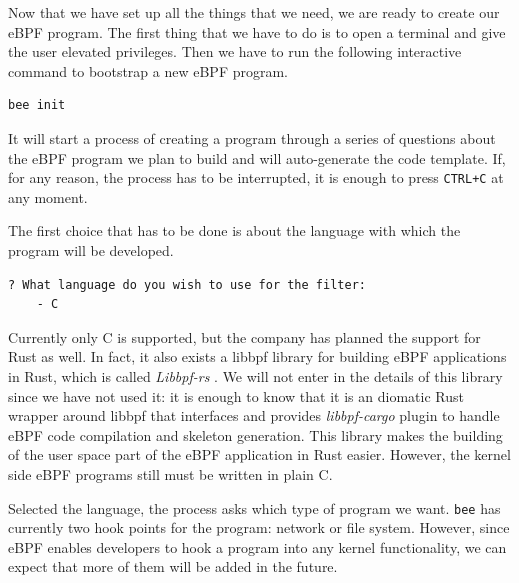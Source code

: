 Now that we have set up all the things that we need, we are ready to create our eBPF program.
The first thing that we have to do is to open a terminal and give the user elevated privileges.
Then we have to run the following interactive command to bootstrap a new eBPF program.

\begin{lstlisting}[style=commandline, language=bash, caption={\colorbox{backcolour}{\lstinline[style=commandline, language=bash]|bee|} init command.}]
	bee init
\end{lstlisting}

It will start a process of creating a program through a series of questions about the eBPF program we plan to build and will auto-generate the code template.
If, for any reason, the process has to be interrupted, it is enough to press \colorbox{backcolour}{\lstinline[style=commandline, language=bash, breaklines=true]|CTRL+C|} at any moment.

The first choice that has to be done is about the language with which the program will be developed.

\begin{lstlisting}[style=commandline, language=bash, caption={\colorbox{backcolour}{\lstinline[style=commandline, language=bash]|bee|} language selection.}]
	? What language do you wish to use for the filter: 
	- C
\end{lstlisting}

Currently only C is supported, but the company has planned the support for Rust as well.
In fact, it also exists a libbpf library for building eBPF applications in Rust, which is called \textit{Libbpf-rs} \cite{libbpfRustGithubRepo}.
We will not enter in the details of this library since we have not used it: it is enough to know that it is an diomatic Rust wrapper around libbpf that interfaces and provides \textit{libbpf-cargo} plugin to handle eBPF code compilation and skeleton generation.
This library makes the building of the user space part of the eBPF application in Rust easier.
However, the kernel side eBPF programs still must be written in plain C.

Selected the language, the process asks which type of program we want.
\colorbox{backcolour}{\lstinline[style=commandline, language=bash, breaklines=true]|bee|} has currently two hook points for the program: network or file system.
However, since eBPF enables developers to hook a program into any kernel functionality, we can expect that more of them will be added in the future.

